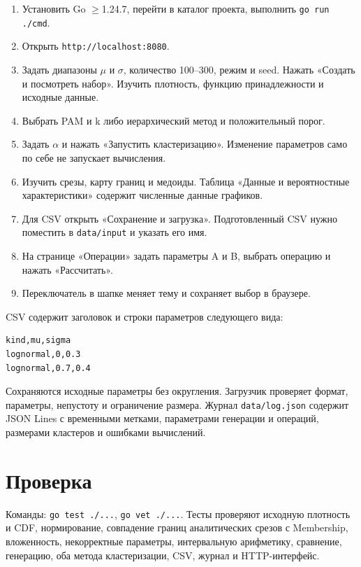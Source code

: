 \documentclass[fontsize=14pt,a4paper]{scrartcl}
\begin{document}
\begin{enumerate}
\item Установить Go \(\geq\)1.24.7, перейти в каталог проекта, выполнить \texttt{go run ./cmd}.
\item Открыть \texttt{http://localhost:8080}.
\item Задать диапазоны \(\mu\) и \(\sigma\), количество 100–300, режим и seed. Нажать «Создать и посмотреть набор». Изучить плотность, функцию принадлежности и исходные данные.
\item Выбрать PAM и k либо иерархический метод и положительный порог.
\item Задать \(\alpha\) и нажать «Запустить кластеризацию». Изменение параметров само по себе не запускает вычисления.
\item Изучить срезы, карту границ и медоиды. Таблица «Данные и вероятностные характеристики» содержит численные данные графиков.
\item Для CSV открыть «Сохранение и загрузка». Подготовленный CSV нужно поместить в \texttt{data/input} и указать его имя.
\item На странице «Операции» задать параметры A и B, выбрать операцию и нажать «Рассчитать».
\item Переключатель в шапке меняет тему и сохраняет выбор в браузере.
\end{enumerate}

CSV содержит заголовок и строки параметров следующего вида:
\begin{samepage}
\begin{verbatim}
kind,mu,sigma
lognormal,0,0.3
lognormal,0.7,0.4
\end{verbatim}
\end{samepage}
 Сохраняются исходные параметры без округления. Загрузчик проверяет формат, параметры, непустоту и ограничение размера. Журнал \texttt{data/log.json} содержит JSON Lines с временными метками, параметрами генерации и операций, размерами кластеров и ошибками вычислений.

\section{Проверка}

Команды: \texttt{go test ./...}, \texttt{go vet ./...}. Тесты проверяют исходную плотность и CDF, нормирование, совпадение границ аналитических срезов с Membership, вложенность, некорректные параметры, интервальную арифметику, сравнение, генерацию, оба метода кластеризации, CSV, журнал и HTTP-интерфейс.
\end{document}
